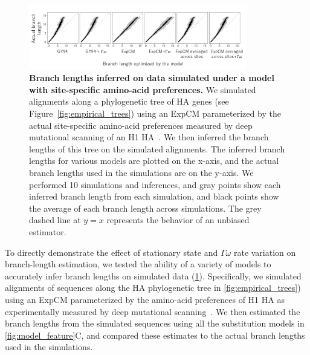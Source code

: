 \documentclass[11pt]{article}
\begin{document}
\begin{figure}
\centerline{\includegraphics[width=0.85\textwidth]{figures/simulations}}
\caption{\label{fig:simulations}
\textbf{Branch lengths inferred on data simulated under a model with site-specific amino-acid preferences.} 
We simulated alignments along a phylogenetic tree of HA genes (see Figure~\ref{fig:empirical_trees}) using an ExpCM parameterized by the actual site-specific amino-acid preferences measured by deep mutational scanning of an H1 HA~\citep{doud2016accurate}.
We then inferred the branch lengths of this tree on the simulated alignments.
The inferred branch lengths for various models are plotted on the x-axis, and the actual branch lengths used in the simulations are on the y-axis.
We performed 10 simulations and inferences, and gray points show each inferred branch length from each simulation, and black points show the average of each branch length across simulations.
The grey dashed line at $y=x$ represents the behavior of an unbiased estimator. 
}
\end{figure}

To directly demonstrate the effect of stationary state and $\Gamma\omega$ rate variation on branch-length estimation, we tested the ability of a variety of models to accurately infer branch lengths on simulated data (\ref{fig:simulations}).
Specifically, we simulated alignments of sequences along the HA phylogenetic tree in \ref{fig:empirical_trees}) using an ExpCM parameterized by the amino-acid preferences of H1 HA as experimentally measured by deep mutational scanning~\citep{doud2016accurate}. We then estimated the branch lengths from the simulated sequences using all the substitution models in \ref{fig:model_feature}C, and compared these estimates to the actual branch lengths used in the simulations.
\end{document}
